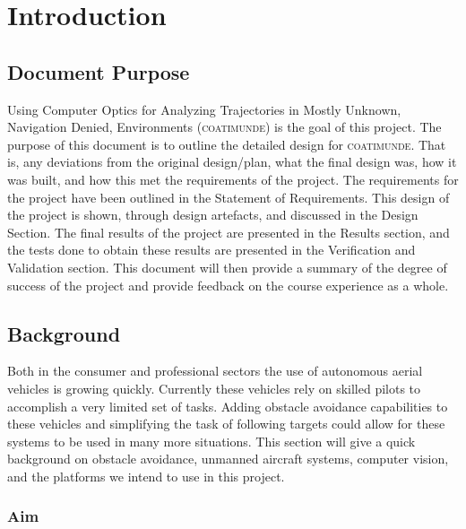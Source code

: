 \documentclass{article}
\begin{document}


\tableofcontents

\newpage

\section{Introduction}

	\subsection{Document Purpose}
	
	Using Computer Optics for Analyzing Trajectories in Mostly Unknown, Navigation Denied, Environments (\textsc{coatimunde}) is the goal of this project. The purpose of this document is to outline the detailed design for \textsc{coatimunde}. That is, any deviations from the original design/plan, what the final design was, how it was built, and how this met the requirements of the project.  The requirements for the project have been outlined in the Statement of Requirements. This design of the project is shown, through design artefacts, and discussed in the Design Section. The final results of the project are presented in the Results section, and the tests done to obtain these results are presented in the Verification and Validation section. This document will then provide a summary of the degree of success of the project and provide feedback on the course experience as a whole.
	
	\subsection{Background}
	
	Both in the consumer and professional sectors the use of autonomous aerial vehicles is growing quickly. Currently these vehicles rely on skilled pilots to accomplish a very limited set of tasks. Adding obstacle avoidance capabilities to these vehicles and simplifying the task of following targets could allow for these systems to be used in many more situations. This section will give a quick background on obstacle avoidance, unmanned aircraft systems, computer vision, and the platforms we intend to use in this project.

		\subsubsection{Aim}
	
\end{document}
